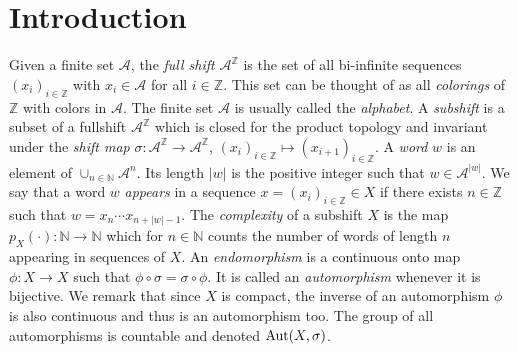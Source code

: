 \documentclass{daj}
\theoremstyle{plain}
\theoremstyle{definition}
\begin{document}


\section{Introduction}
Given a finite set $\mathcal{A}$, the {\em full shift } ${\mathcal A}^{{\mathbb Z}}$ is the set of all bi-infinite sequences $(x_i)_{i\in \mathbb{Z}}$ with $x_i  \in \mathcal{A}$ for all $i\in \mathbb{Z}$. This set can be thought of as all {\em colorings} of $\mathbb{Z}$ with colors in $\mathcal{A}$.  The finite set $\mathcal{A}$ is usually called the {\em alphabet}.    A \emph{subshift} is a subset of a fullshift ${\mathcal A}^{{\mathbb Z}}$ which is closed for the product topology and invariant under the {\em shift map} $\sigma\colon \mathcal{A}^{\mathbb{Z}}\to \mathcal{A}^{\mathbb{Z}}$, $(x_i)_{i\in \mathbb{Z}}\mapsto (x_{i+1})_{i\in \mathbb{Z}}$.  A {\em word}  $w$ is an element of  $\cup_{n\in \mathbb{N}} \mathcal{A}^n$. Its length $|w|$ is the positive integer such that $w\in \mathcal{A}^{|w|}$.   We say that a word $w$  {\em appears } in a sequence $x=(x_i)_{i \in \mathbb{Z}}\in X$ if there exists $n\in \mathbb{Z}$ such that $w=x_n\cdots x_{n+|w|-1}$. The \emph{complexity} of a subshift $X$ is the map $p_X(\cdot):\mathbb{N}\to \mathbb{N}$ which for $n\in \mathbb{N}$ counts the number of  words of length $n$ appearing in sequences of $X$. An {\em endomorphism} is a continuous onto  map $\phi \colon X \to X$ such that $\phi\circ \sigma=\sigma\circ \phi$. It is called an {\em automorphism} whenever it is bijective. We remark that since $X$ is compact, the inverse of an automorphism $\phi$ is also continuous and thus is an automorphism too.   The group of all automorphisms is countable and denoted ${\rm Aut}(X,\sigma)$.
\end{document}
